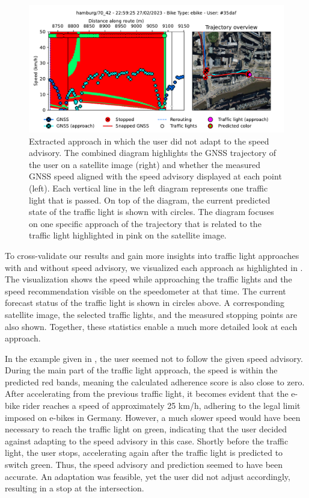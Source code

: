 \begin{figure}[t]
\caption{Extracted approach in which the user did not adapt to the speed advisory. The combined diagram highlights the GNSS trajectory of the user on a satellite image (right) and whether the measured GNSS speed aligned with the speed advisory displayed at each point (left). Each vertical line in the left diagram represents one traffic light that is passed. On top of the diagram, the current predicted state of the traffic light is shown with circles. The diagram focuses on one specific approach of the trajectory that is related to the traffic light highlighted in pink on the satellite image.}\label{fig:example-trajectory-not-adapted}
\includegraphics[width=\linewidth]{images/example-trajectory-not-adapted.pdf}
\end{figure}

To cross-validate our results and gain more insights into traffic light approaches with and without speed advisory, we visualized each approach as highlighted in . The visualization shows the speed while approaching the traffic lights and the speed recommendation visible on the speedometer at that time. The current forecast status of the traffic light is shown in circles above. A corresponding satellite image, the selected traffic lights, and the measured stopping points are also shown. Together, these statistics enable a much more detailed look at each approach.

In the example given in , the user seemed not to follow the given speed advisory. During the main part of the traffic light approach, the speed is within the predicted red bands, meaning the calculated adherence score is also close to zero. After accelerating from the previous traffic light, it becomes evident that the e-bike rider reaches a speed of approximately 25 km/h, adhering to the legal limit imposed on e-bikes in Germany. However, a much slower speed would have been necessary to reach the traffic light on green, indicating that the user decided against adapting to the speed advisory in this case. Shortly before the traffic light, the user stops, accelerating again after the traffic light is predicted to switch green. Thus, the speed advisory and prediction seemed to have been accurate. An adaptation was feasible, yet the user did not adjust accordingly, resulting in a stop at the intersection.

